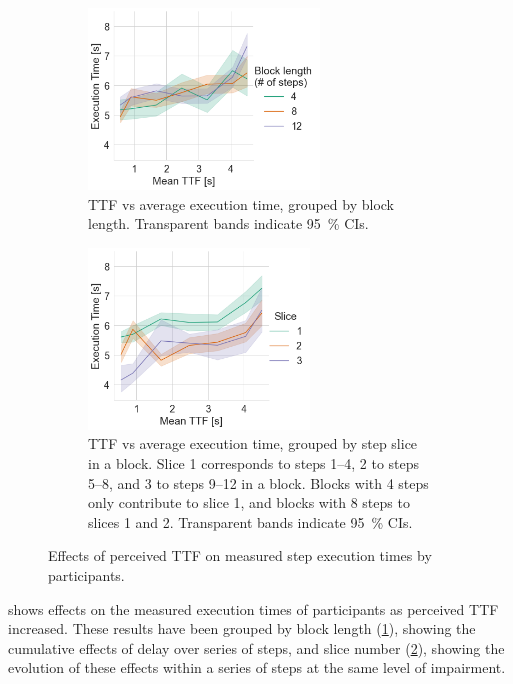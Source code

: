 \begin{figure}[tb]
    \centering
    \begin{subfigure}[t]{0.45\textwidth}
        \includegraphics[height=13em]{./Figs/2021Impact/ttf_vs_exectime_per_block}
        \caption{%
            \gls{TTF} vs average execution time, grouped by block length.
            Transparent bands indicate \SI{95}{\percent} \glspl{CI}.
        }\label{fig:ttfvsexectime:block}
    \end{subfigure}%
    \hfill%
    \begin{subfigure}[t]{0.45\textwidth}
        \includegraphics[height=13em]{./Figs/2021Impact/ttf_vs_exectime_per_slice}
        \caption{%
            \gls{TTF} vs average execution time, grouped by step slice in a block.
            Slice \num{1} corresponds to steps \numrange{1}{4}, \num{2} to steps \numrange{5}{8}, and \num{3} to steps \numrange{9}{12} in a block.
            Blocks with \num{4} steps only contribute to slice \num{1}, and blocks with \num{8} steps to slices \num{1} and \num{2}.
            Transparent bands indicate \SI{95}{\percent} \glspl{CI}.
        }\label{fig:ttfvsexectime:slice}
    \end{subfigure}%
    \caption{Effects of perceived \gls{TTF} on measured step execution times by participants.}\label{fig:ttfvsexectime}
\end{figure}

 shows effects on the measured execution times of participants as perceived \gls{TTF} increased.
These results have been grouped by block length (\cref{fig:ttfvsexectime:block}), showing the cumulative effects of delay over series of steps, and slice number (\cref{fig:ttfvsexectime:slice}), showing the evolution of these effects within a series of steps at the same level of impairment.


